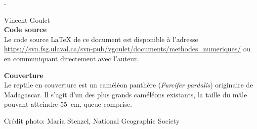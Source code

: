 \begingroup
\calccentering{\unitlength}
\begin{adjustwidth*}{\unitlength}{-\unitlength}
  \setlength{\parindent}{0pt}
  \setlength{\parskip}{\baselineskip}

  {\textcopyright} {\year} Vincent Goulet \\

  

  \textbf{Code source} \\
  Le code source {\LaTeX} de ce document est disponible à l'adresse
    \url{https://svn.fsg.ulaval.ca/svn-pub/vgoulet/documents/methodes_numeriques/}
  ou en communiquant directement avec l'auteur.

  \textbf{Couverture} \\
  Le reptile en couverture est un caméléon panthère (\emph{Furcifer
    pardalis}) originaire de Madagascar. Il s'agit d'un des plus
  grands caméléons existants, la taille du mâle pouvant atteindre
  55~cm, queue comprise.

  Crédit photo: Maria Stenzel, National Geographic Society
\end{adjustwidth*}
\endgroup

